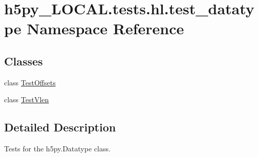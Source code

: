 \hypertarget{namespaceh5py__LOCAL_1_1tests_1_1hl_1_1test__datatype}{}\section{h5py\+\_\+\+L\+O\+C\+A\+L.\+tests.\+hl.\+test\+\_\+datatype Namespace Reference}
\label{namespaceh5py__LOCAL_1_1tests_1_1hl_1_1test__datatype}
\subsection*{Classes}
\begin{DoxyCompactItemize}
\item 
class \hyperlink{classh5py__LOCAL_1_1tests_1_1hl_1_1test__datatype_1_1TestOffsets}{Test\+Offsets}
\item 
class \hyperlink{classh5py__LOCAL_1_1tests_1_1hl_1_1test__datatype_1_1TestVlen}{Test\+Vlen}
\end{DoxyCompactItemize}


\subsection{Detailed Description}
\begin{DoxyVerb}    Tests for the h5py.Datatype class.
\end{DoxyVerb}
 